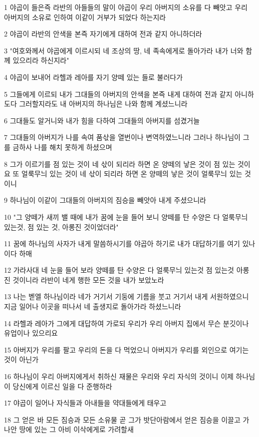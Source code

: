 \par 1 야곱이 들은즉 라반의 아들들의 말이 야곱이 우리 아버지의 소유를 다 빼앗고 우리 아버지의 소유로 인하여 이같이 거부가 되었다 하는지라
\par 2 야곱이 라반의 안색을 본즉 자기에게 대하여 전과 같지 아니하더라
\par 3 "여호와께서 야곱에게 이르시되 네 조상의 땅, 네 족속에게로 돌아가라 내가 너와 함께 있으리라 하신지라"
\par 4 야곱이 보내어 라헬과 레아를 자기 양떼 있는 들로 불러다가
\par 5 그들에게 이르되 내가 그대들의 아버지의 안색을 본즉 내게 대하여 전과 같지 아니하도다 그러할지라도 내 아버지의 하나님은 나와 함께 계셨느니라
\par 6 그대들도 알거니와 내가 힘을 다하여 그대들의 아버지를 섬겼거늘
\par 7 그대들의 아버지가 나를 속여 품삯을 열번이나 변역하였느니라 그러나 하나님이 그를 금하사 나를 해치 못하게 하셨으며
\par 8 그가 이르기를 점 있는 것이 네 삯이 되리라 하면 온 양떼의 낳은 것이 점 있는 것이요 또 얼룩무늬 있는 것이 네 삯이 되리라 하면 온 양떼의 낳은 것이 얼룩무늬 있는 것이니
\par 9 하나님이 이같이 그대들의 아버지의 짐승을 빼앗아 내게 주셨으니라
\par 10 "그 양떼가 새끼 밸 때에 내가 꿈에 눈을 들어 보니 양떼를 탄 수양은 다 얼룩무늬 있는것, 점 있는 것, 아롱진 것이었더라"
\par 11 꿈에 하나님의 사자가 내게 말씀하시기를 야곱아 하기로 내가 대답하기를 여기 있나이다 하매
\par 12 가라사대 네 눈을 들어 보라 양떼를 탄 수양은 다 얼룩무늬 있는것 점 있는것 아롱진 것이니라 라반이 네게 행한 모든 것을 내가 보았노라
\par 13 나는 벧엘 하나님이라 네가 거기서 기둥에 기름을 붓고 거기서 내게 서원하였으니 지금 일어나 이곳을 떠나서 네 출생지로 돌아가라 하셨느니라
\par 14 라헬과 레아가 그에게 대답하여 가로되 우리가 우리 아버지 집에서 무슨 분깃이나 유업이나 있으리요
\par 15 아버지가 우리를 팔고 우리의 돈을 다 먹었으니 아버지가 우리를 외인으로 여기는 것이 아닌가
\par 16 하나님이 우리 아버지에게서 취하신 재물은 우리와 우리 자식의 것이니 이제 하나님이 당신에게 이르신 일을 다 준행하라
\par 17 야곱이 일어나 자식들과 아내들을 약대들에게 태우고
\par 18 그 얻은 바 모든 짐승과 모든 소유물 곧 그가 밧단아람에서 얻은 짐승을 이끌고 가나안 땅에 있는 그 아비 이삭에게로 가려할새
